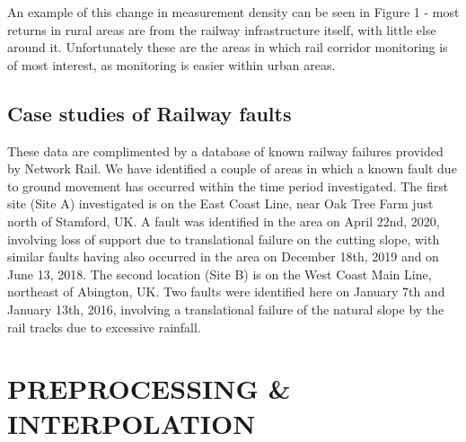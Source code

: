 \documentclass{article}
\begin{document}
An example of this change in measurement density can be seen in Figure 1 - most returns in rural areas are from the railway infrastructure itself, with little else around it. Unfortunately these are the areas in which rail corridor monitoring is of most interest, as monitoring is easier within urban areas. %
 
 
 \subsection{Case studies of Railway faults}
These data are complimented by a database of known railway failures provided by Network Rail. We have identified a couple of areas in which a known fault due to ground movement has occurred within the time period investigated. 
The first site (Site A) investigated is on the East Coast Line, near Oak Tree Farm just north of Stamford, UK. A fault was identified in the area on April 22nd, 2020, involving loss of support due to translational failure on the cutting slope, with similar faults having also occurred in the area on December 18th, 2019 and on June 13, 2018. The second location (Site B) is on the West Coast Main Line, northeast of Abington, UK. Two faults were identified here on January 7th and January 13th, 2016, involving a translational failure of the natural slope by the rail tracks due to excessive rainfall. 

 




\section{PREPROCESSING \& INTERPOLATION}
\end{document}
